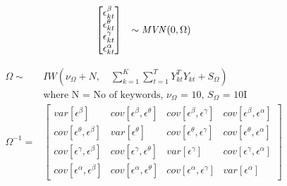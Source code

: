 \begin{equation}
    \begin{array}{rl}
         \begin{bmatrix}
         \epsilon^{\beta}_{kt}\\
         \epsilon^{\theta}_{kt}\\
         \epsilon^{\gamma}_{kt}\\
         \epsilon^{\alpha}_{kt}
         \end{bmatrix}
         & \sim \text{\textit{MVN}}(0, \Omega)
    \end{array}
\end{equation}

\begin{equation}
    \begin{array}{rl} \label{eq:omega}
         \Omega \sim& IW(\nu_\Omega + N, \quad \sum\nolimits^K_{k=1} \sum\nolimits^T_{t=1} Y_{kt}^T Y_{kt} + S_\Omega)\\[5pt]
         &\text{where N = No of keywords, $\nu_\Omega$ = 10, $S_\Omega$ = 10I}\\[10pt]
         \Omega^{-1} =& \begin{bmatrix}
         var[\epsilon^{\beta}] & cov[\epsilon^{\beta}, \epsilon^{\theta}]& cov[\epsilon^{\beta}, \epsilon^{\gamma}]& cov[\epsilon^{\beta}, \epsilon^{\alpha}]\\
         cov[\epsilon^{\theta}, \epsilon^{\beta}] & var[\epsilon^{\theta}]& cov[\epsilon^{\theta}, \epsilon^{\gamma}]& cov[\epsilon^{\theta}, \epsilon^{\alpha}]\\
         cov[\epsilon^{\gamma}, \epsilon^{\beta}] & cov[\epsilon^{\gamma}, \epsilon^{\theta}]& var[\epsilon^{\gamma}]& cov[\epsilon^{\gamma}, \epsilon^{\alpha}]\\
         cov[\epsilon^{\alpha}, \epsilon^{\beta}] & cov[\epsilon^{\alpha}, \epsilon^{\theta}]& cov[\epsilon^{\alpha}, \epsilon^{\gamma}] & var[\epsilon^{\alpha}]
         \end{bmatrix}
    \end{array}
\end{equation}

